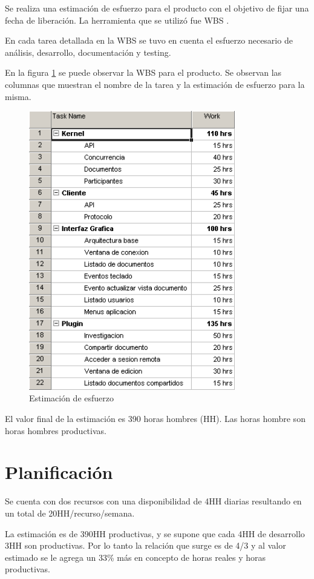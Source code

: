 \documentclass[12pt,a4paper]{article}
\begin{document}
	Se realiza una estimación de esfuerzo para el producto con el objetivo de fijar una fecha de liberación. La herramienta que se utilizó fue WBS \cite{wbs}.

	En cada tarea detallada en la WBS se tuvo en cuenta el esfuerzo necesario de análisis, desarrollo, documentación y testing.

	En la figura \ref{WBS} se puede observar la WBS para el producto. Se observan las columnas que muestran el nombre de la tarea y la estimación de esfuerzo para la misma.

	\begin{figure}[!ht]
		\begin{center}
			\includegraphics[width=9cm]{wbs.png}
			\caption{\label{WBS} Estimación de esfuerzo }
		\end{center}
	\end{figure}

	El valor final de la estimación es 390 horas hombres (HH). Las horas hombre son horas hombres productivas.

	\section{Planificación}

	Se cuenta con dos recursos con una disponibilidad de 4HH diarias resultando en un total de 20HH/recurso/semana.

	La estimación es de 390HH productivas, y se supone que cada 4HH de desarrollo 3HH son productivas. Por lo tanto la relación que surge es de 4/3 y al valor estimado se le agrega un 33\% más en concepto de horas reales y horas productivas.
\end{document}
